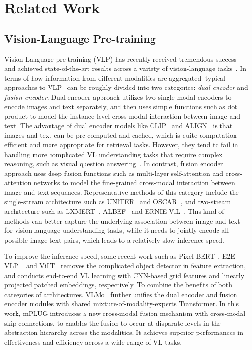 \documentclass[11pt]{article}
\begin{document}
\section{Related Work} \subsection{Vision-Language Pre-training}
Vision-Language pre-training (VLP) has recently received tremendous success and achieved state-of-the-art results across a variety of vision-language  tasks~\cite{antol2015vqa,chen2015microsoft,yu2016modeling}. In terms of how information from different modalities are aggregated, typical approaches to VLP~\cite{tan2019lxmert,chen2020uniter,huang2020pixel,yu2021ernie,li2021align,radford2021learning,jia2021scaling} can be roughly divided into two categories: \textit{dual encoder} and \textit{fusion encoder}. Dual encoder approach utilizes two single-modal encoders to encode images and text separately, and then uses simple functions such as dot product to model the instance-level cross-modal interaction between image and text. The advantage of dual encoder models like CLIP~\cite{radford2021learning} and ALIGN~\cite{jia2021scaling} is that images and text can be pre-computed and cached, which is quite computation-efficient and more appropriate for retrieval tasks. However, they tend to fail in handling more complicated VL understanding tasks that require complex reasoning, such as visual question answering~\cite{antol2015vqa}. In contrast, fusion encoder approach uses deep fusion functions such as multi-layer self-attention and cross-attention networks to model the fine-grained cross-modal interaction between image and text sequences. Representative methods of this category include the single-stream architecture such as UNITER~\cite{chen2020uniter} and OSCAR~\cite{li2020oscar}, and two-stream architecture such as LXMERT~\cite{tan2019lxmert}, ALBEF~\cite{li2021align} and ERNIE-ViL~\cite{yu2021ernie}. This kind of methods can better capture the underlying association between image and text for vision-language understanding tasks, while it needs to jointly encode all possible image-text pairs, which leads to a relatively slow inference speed. 

To improve the inference speed, some recent work such as Pixel-BERT~\cite{huang2020pixel}, E2E-VLP ~\cite{xu2021e2e} and ViLT~\cite{kim2021vilt} removes the complicated object detector in feature extraction, and conducts end-to-end VL learning with CNN-based grid features and linearly projected patched embeddings, respectively. To combine the benefits of both categories of architectures, VLMo~\cite{wang2021vlmo} further unifies the dual encoder and fusion encoder modules with shared mixture-of-modality-experts Transformer. In this work, mPLUG introduces a new cross-modal fusion mechanism with cross-modal skip-connections, to enables the fusion to occur at disparate levels in the abstraction hierarchy across the modalities. It achieves superior performances in effectiveness and efficiency across a wide range of VL tasks.
\end{document}
